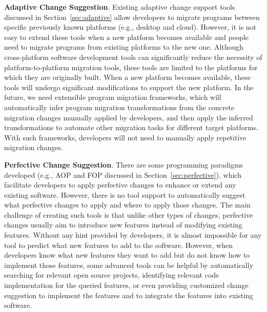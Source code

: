 \textbf{Adaptive Change Suggestion}. Existing adaptive change support tools discussed in Section~\ref{sec:adaptive} allow developers to migrate programs between specific previously known platforms (e.g., desktop and cloud).  However, it is not easy to extend these tools when a new platform becomes available and people need to migrate programs from existing platforms to the new one.
Although cross-platform software development tools can significantly reduce the necessity of platform-to-platform migration tools, these tools are limited to the platforms for which they are originally built. When a new platform becomes available, these tools will undergo significant modifications to support the new platform. In the future, we need extensible program migration frameworks, which will automatically infer program migration transformations from the concrete migration changes manually applied by developers, and then apply the inferred transformations to automate other migration tasks for different target platforms. With such frameworks, developers will not need to manually apply repetitive migration changes. 

\textbf{Perfective Change Suggestion}. There are some programming paradigms developed (e.g., AOP and FOP discussed in Section~\ref{sec:perfective}), which facilitate developers to apply perfective changes to enhance or extend any existing software. However, there is no tool support to automatically suggest what perfective changes to apply and where to apply those changes. The main challenge of creating such tools is that unlike other types of changes, perfective changes usually aim to introduce new features instead of modifying existing features. Without any hint provided by developers, it is almost impossible for any tool to predict what new features to add to the software. However, when developers know what new features they want to add but do not know how to implement those features, some advanced tools can be helpful by automatically searching for relevant open source projects, identifying relevant code implementation for the queried features, or even providing customized change suggestion to implement the features and to integrate the features into existing software.


